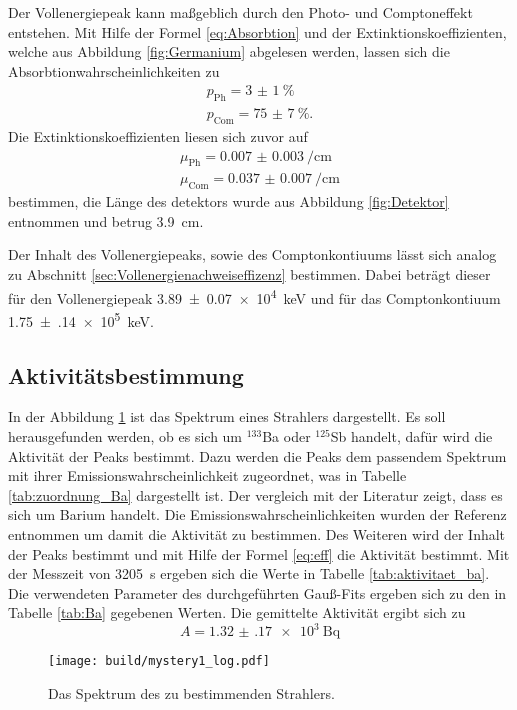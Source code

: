 Der Vollenergiepeak kann maßgeblich durch den Photo- und Comptoneffekt entstehen. Mit Hilfe der Formel \ref{eq:Absorbtion} und 
der Extinktionskoeffizienten, welche aus Abbildung \ref{fig:Germanium} abgelesen werden, lassen sich die Absorbtionwahrscheinlichkeiten
zu
\begin{align}
  p_\text{Ph} = \SI{3(1)}{\percent} \\
  p_\text{Com} = \SI{75(7)}{\percent}.
\end{align}
Die Extinktionskoeffizienten liesen sich zuvor auf 
\begin{gather}
  \mu_\text{Ph} = \SI{0.007(3)}{\per\centi\meter} \\
  \mu_\text{Com} = \SI{0.037(7)}{\per\centi\meter}
\end{gather}
bestimmen, die Länge des detektors wurde aus Abbildung \ref{fig:Detektor} entnommen und betrug \SI{3.9}{\centi\meter}.

Der Inhalt des Vollenergiepeaks, sowie des Comptonkontiuums lässt sich analog zu Abschnitt \ref{sec:Vollenergienachweiseffizenz}
bestimmen. Dabei beträgt dieser für den Vollenergiepeak \SI{3.89(7)e4}{\kilo\electronvolt} und für das Comptonkontiuum 
\SI{1.75(14)e5}{\kilo\electronvolt}.


\subsection{Aktivitätsbestimmung}
\label{sec:Aktiv}
In der Abbildung \ref{fig:mystery1} ist das Spektrum eines Strahlers dargestellt. Es soll herausgefunden werden,
ob es sich um ${}^{133}$Ba oder ${}^{125}$Sb handelt, dafür wird die Aktivität der Peaks bestimmt. Dazu werden
die Peaks dem passendem Spektrum mit ihrer Emissionswahrscheinlichkeit zugeordnet, was in Tabelle \ref{tab:zuordnung_Ba}
dargestellt ist. Der vergleich mit der Literatur \cite{referenz1} zeigt, dass es sich um Barium handelt. Die Emissionswahrscheinlichkeiten
wurden der Referenz \cite{referenz2} entnommen um damit die Aktivität zu bestimmen. 
Des Weiteren wird der Inhalt der Peaks bestimmt und mit Hilfe der Formel 
\ref{eq:eff} die Aktivität bestimmt. Mit der Messzeit von \SI{3205}{\second} ergeben sich die Werte in Tabelle 
\ref{tab:aktivitaet_ba}. Die verwendeten Parameter des durchgeführten Gauß-Fits ergeben sich zu den in Tabelle \ref{tab:Ba} 
gegebenen Werten. Die gemittelte Aktivität ergibt sich zu
\begin{equation}
  A = \SI{1.32(17)e3}{\becquerel}
\end{equation}
 


\begin{figure}[htb]
 \centering
 \texttt{[image: build/mystery1\_log.pdf]}
 \caption{Das Spektrum des zu bestimmenden Strahlers.}
 \label{fig:mystery1}
\end{figure}




